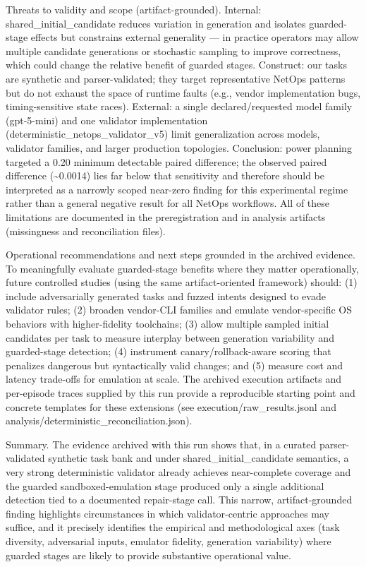 \documentclass[conference]{IEEEtran}
\begin{document}
Threats to validity and scope (artifact-grounded). Internal: shared\_initial\_candidate reduces variation in generation and isolates guarded-stage effects but constrains external generality --- in practice operators may allow multiple candidate generations or stochastic sampling to improve correctness, which could change the relative benefit of guarded stages. Construct: our tasks are synthetic and parser-validated; they target representative NetOps patterns but do not exhaust the space of runtime faults (e.g., vendor implementation bugs, timing-sensitive state races). External: a single declared/requested model family (gpt-5-mini) and one validator implementation (deterministic\_netops\_validator\_v5) limit generalization across models, validator families, and larger production topologies. Conclusion: power planning targeted a 0.20 minimum detectable paired difference; the observed paired difference (\textasciitilde{}0.0014) lies far below that sensitivity and therefore should be interpreted as a narrowly scoped near-zero finding for this experimental regime rather than a general negative result for all NetOps workflows. All of these limitations are documented in the preregistration and in analysis artifacts (missingness and reconciliation files).

Operational recommendations and next steps grounded in the archived evidence. To meaningfully evaluate guarded-stage benefits where they matter operationally, future controlled studies (using the same artifact-oriented framework) should: (1) include adversarially generated tasks and fuzzed intents designed to evade validator rules; (2) broaden vendor-CLI families and emulate vendor-specific OS behaviors with higher-fidelity toolchains; (3) allow multiple sampled initial candidates per task to measure interplay between generation variability and guarded-stage detection; (4) instrument canary/rollback-aware scoring that penalizes dangerous but syntactically valid changes; and (5) measure cost and latency trade-offs for emulation at scale. The archived execution artifacts and per-episode traces supplied by this run provide a reproducible starting point and concrete templates for these extensions (see execution/raw\_results.jsonl and analysis/deterministic\_reconciliation.json).

Summary. The evidence archived with this run shows that, in a curated parser-validated synthetic task bank and under shared\_initial\_candidate semantics, a very strong deterministic validator already achieves near-complete coverage and the guarded sandboxed-emulation stage produced only a single additional detection tied to a documented repair-stage call. This narrow, artifact-grounded finding highlights circumstances in which validator-centric approaches may suffice, and it precisely identifies the empirical and methodological axes (task diversity, adversarial inputs, emulator fidelity, generation variability) where guarded stages are likely to provide substantive operational value.
\end{document}
